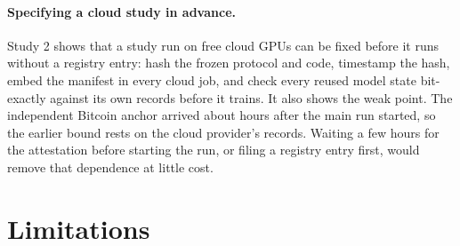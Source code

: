 \documentclass[11pt]{article}
\begin{document}
\paragraph{Specifying a cloud study in advance.} Study 2 shows that a study run on free cloud GPUs can be fixed
before it runs without a registry entry: hash the frozen protocol and code, timestamp the hash, embed the
manifest in every cloud job, and check every reused model state bit-exactly against its own records before it
trains. It also shows the weak point. The independent Bitcoin anchor arrived about \twoBlockAfterStart{} hours after the main run
started, so the earlier bound rests on the cloud provider's records. Waiting a few hours for the attestation
before starting the run, or filing a registry entry first, would remove that dependence at little cost.

\section{Limitations}
\label{sec:limitations}
\end{document}
